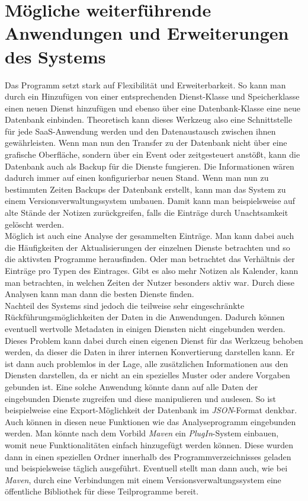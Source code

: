 \section{Mögliche weiterführende Anwendungen und Erweiterungen des Systems}
Das Programm setzt stark auf Flexibilität und Erweiterbarkeit. So kann man durch ein Hinzufügen von einer entsprechenden Dienst-Klasse und Speicherklasse einen neuen Dienst hinzufügen und ebenso über eine Datenbank-Klasse eine neue Datenbank einbinden. Theoretisch kann dieses Werkzeug also eine Schnittstelle für jede SaaS-Anwendung werden und den Datenaustausch zwischen ihnen gewährleisten. Wenn man nun den Transfer zu der Datenbank nicht über eine grafische Oberfläche, sondern über ein Event oder zeitgesteuert anstößt, kann die Datenbank auch als Backup für die Dienste fungieren. Die Informationen wären dadurch immer auf einen konfigurierbar neuen Stand. Wenn man nun zu bestimmten Zeiten Backups der Datenbank erstellt, kann man das System zu einem Versionsverwaltungssystem umbauen. Damit kann man beispielsweise auf alte Stände der Notizen zurückgreifen, falls die Einträge durch Unachtsamkeit gelöscht werden.\\
Möglich ist auch eine Analyse der gesammelten Einträge. Man kann dabei auch die Häufigkeiten der Aktualisierungen der einzelnen Dienste betrachten und so die aktivsten Programme herausfinden. Oder man betrachtet das Verhältnis der Einträge pro Typen des Eintrages. Gibt es also mehr Notizen als Kalender, kann man betrachten, in welchen Zeiten der Nutzer besonders aktiv war. Durch diese Analysen kann man dann die besten Dienste finden. \\
Nachteil des Systems sind jedoch die teilweise sehr eingeschränkte Rückführungsmöglichkeiten der Daten in die Anwendungen. Dadurch können eventuell wertvolle Metadaten in einigen Diensten nicht eingebunden werden. Dieses Problem kann dabei durch einen eigenen Dienst für das Werkzeug behoben werden, da dieser die Daten in ihrer internen Konvertierung darstellen kann. Er ist dann auch problemlos in der Lage, alle zusätzlichen Informationen aus den Diensten darstellen, da er nicht an ein spezielles Muster oder andere Vorgaben gebunden ist. Eine solche Anwendung könnte dann auf alle Daten der eingebunden Dienste zugreifen und diese manipulieren und auslesen. So ist beispielweise eine Export-Möglichkeit der Datenbank im \textit{JSON}-Format denkbar. Auch können in diesen neue Funktionen wie das Analyseprogramm eingebunden werden. Man könnte nach dem Vorbild \textit{Maven} ein \textit{PlugIn}-System einbauen, womit neue Funktionalitäten einfach hinzugefügt werden können. Diese wurden dann in einen speziellen Ordner innerhalb des Programmverzeichnisses geladen und beispielsweise täglich ausgeführt. Eventuell stellt man dann auch, wie bei \textit{Maven}, durch eine Verbindungen mit einem Versionsverwaltungssystem eine öffentliche Bibliothek für diese Teilprogramme bereit.\\